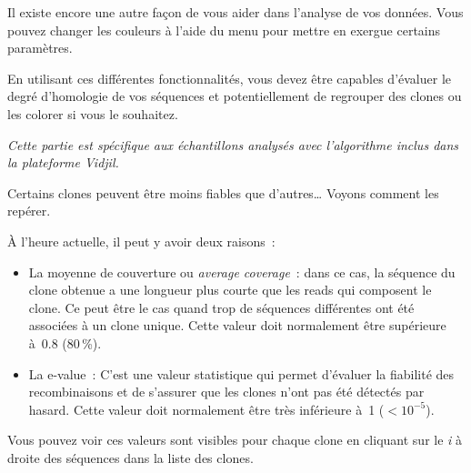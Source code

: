 \documentclass[10pt]{article}
\begin{document}
Il existe encore une autre façon de vous aider dans l'analyse de vos
données. Vous pouvez changer les
couleurs à l'aide du menu  pour mettre en
exergue certains paramètres.



En utilisant ces différentes fonctionnalités, vous devez être capables
d'évaluer le degré d'homologie de vos séquences et potentiellement de
regrouper des clones ou les colorer si vous le souhaitez.

\bigskip

\textit{Cette partie est spécifique aux échantillons analysés avec
l'algorithme inclus dans la plateforme Vidjil.}

Certains clones peuvent être moins fiables que d'autres\ldots{} Voyons
comment les repérer.

À l'heure actuelle, il peut y avoir deux raisons~:
\begin{itemize}
\item
  La moyenne de couverture ou \textit{average coverage}~: dans ce cas, la
  séquence du clone obtenue a une longueur plus courte que les reads qui
  composent le clone. Ce peut être le cas quand trop de séquences
  différentes ont été associées à un clone unique. Cette valeur doit
  normalement être supérieure à~0.8 (80\,\%).
\item
  La e-value~: C'est une valeur statistique qui permet d'évaluer la
  fiabilité des recombinaisons et de s'assurer que les clones n'ont pas été détectés
  par hasard. Cette valeur doit normalement être très
  inférieure à~1 ($<10^{-5}$).
\end{itemize}

Vous pouvez voir ces valeurs sont visibles pour chaque clone en cliquant
sur le \textit{i} à droite des séquences dans la liste des clones.
\end{document}
